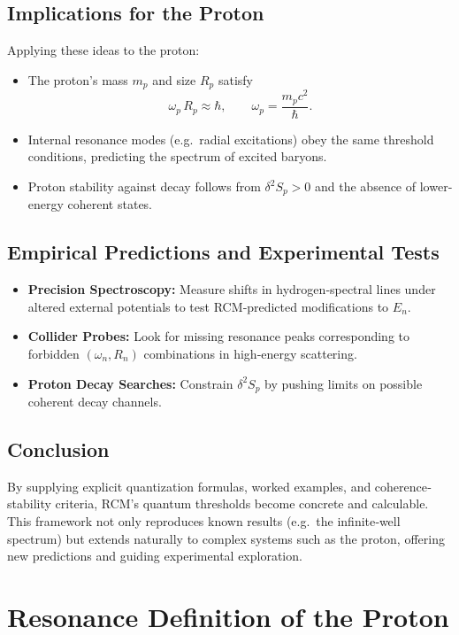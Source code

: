 \subsection{Implications for the Proton}
Applying these ideas to the proton:
\begin{itemize}
  \item  The proton’s mass $m_p$ and size $R_p$ satisfy
  \[
    \omega_p\,R_p \approx \hbar,
    \qquad \omega_p = \frac{m_p c^2}{\hbar}.
  \]
  \item  Internal resonance modes (e.g.\ radial excitations) obey the same threshold conditions, predicting the spectrum of excited baryons.
  \item  Proton stability against decay follows from $\delta^2S_p>0$ and the absence of lower‐energy coherent states.
\end{itemize}

\subsection{Empirical Predictions and Experimental Tests}
\begin{itemize}
  \item \textbf{Precision Spectroscopy:} Measure shifts in hydrogen‐spectral lines under altered external potentials to test RCM‐predicted modifications to $E_n$.  
  \item \textbf{Collider Probes:} Look for missing resonance peaks corresponding to forbidden $(\omega_n,R_n)$ combinations in high‐energy scattering.  
  \item \textbf{Proton Decay Searches:} Constrain $\delta^2S_p$ by pushing limits on possible coherent decay channels.
\end{itemize}

\subsection{Conclusion}
By supplying explicit quantization formulas, worked examples, and coherence‐stability criteria, RCM’s quantum thresholds become concrete and calculable.  This framework not only reproduces known results (e.g.\ the infinite‐well spectrum) but extends naturally to complex systems such as the proton, offering new predictions and guiding experimental exploration.


\section{Resonance Definition of the Proton}

